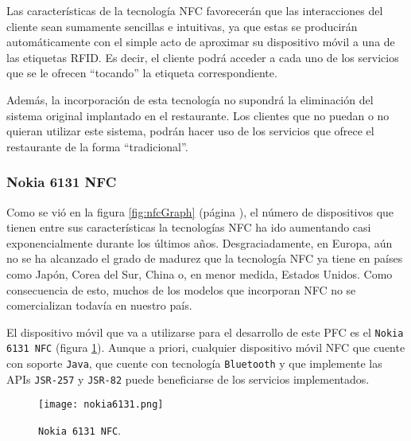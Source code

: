 Las características de la tecnología \acs{NFC} favorecerán que las 
interacciones del cliente sean sumamente sencillas e intuitivas, ya que estas 
se producirán automáticamente con el simple acto de aproximar su dispositivo 
móvil a una de las etiquetas \acs{RFID}. Es decir, el cliente podrá acceder
a cada uno de los servicios que se le ofrecen ``tocando'' la etiqueta
correspondiente.

Además, la incorporación de esta tecnología no supondrá la eliminación del
sistema original implantado en el restaurante. Los clientes que no puedan
o no quieran utilizar este sistema, podrán hacer uso de los servicios que 
ofrece el restaurante de la forma ``tradicional''.

    \subsubsection{Nokia 6131 \acs{NFC}}
Como se vió en la figura \ref{fig:nfcGraph} (página
\pageref{fig:nfcGraph}), el número de dispositivos que tienen entre sus 
características la tecnologías \acs{NFC} ha ido aumentando casi 
exponencialmente durante los últimos años. Desgraciadamente, en Europa, aún 
no se ha alcanzado el grado de madurez que la tecnología \acs{NFC} ya tiene 
en países como Japón, Corea del Sur, China o, en menor medida, Estados 
Unidos. Como consecuencia de esto, muchos de los modelos que incorporan
\acs{NFC} no se comercializan todavía en nuestro país.

El dispositivo móvil que va a utilizarse para el desarrollo de este
\acs{PFC} es el \texttt{Nokia 6131 \acs{NFC}} (figura \ref{fig:nokia6131}). 
Aunque a priori, cualquier dispositivo móvil \acs{NFC} que cuente con soporte 
\texttt{Java}, que cuente con tecnología \texttt{Bluetooth} y que implemente las 
\acs{API}s \texttt{\acs{JSR}-257} y \texttt{\acs{JSR}-82} puede beneficiarse 
de los servicios implementados.

\begin{figure}[!h]
  \begin{center}
    \texttt{[image: nokia6131.png]}
    \caption{\texttt{Nokia 6131 \acs{NFC}}.}
    \label{fig:nokia6131}
  \end{center}
\end{figure}

